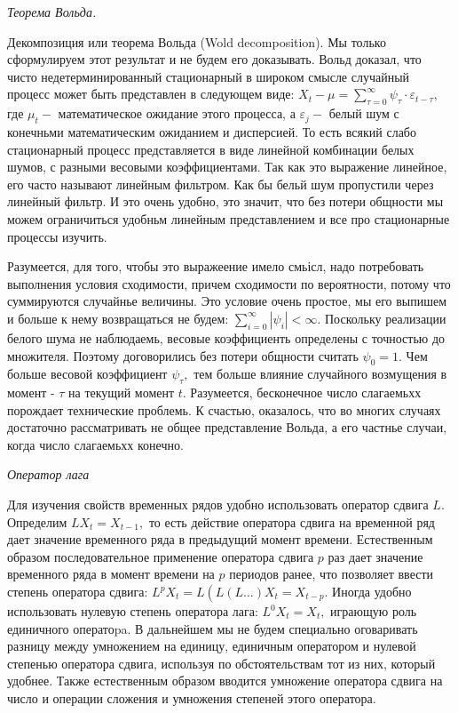 \documentclass[a4paper,8pt]{article} %
\begin{document}
\textit{Теорема Вольда. }

Декомпозиция или теорема Вольда (Wold decomposition). Мы только сформулируем этот результат и не будем его доказывать. Вольд доказал, что чисто недетерминированный стационарный в широком смысле случайный процесс может быть представлен в следующем виде: $X_{t}-\mu=\sum_{\tau=0}^{\infty} \psi_{\tau} \cdot \varepsilon_{t-\tau},$ где $\mu_{t}-$ математическое ожидание этого процесса, а $\varepsilon_{j}-$ белый шум с конечньми математическим ожиданием и дисперсией. То есть всякий слабо стационарный процесс представляется в виде линейной комбинации белых шумов, с разными весовыми коэффициентами. Так как это выражение линейное, его часто называют линейным фильтром. Как бы бельй шум пропустили через линейный фильтр. И это очень удобно, это значит, что без потери общности мы можем ограничиться удобньм линейным представлением и все про стационарные процессы изучить.

Разумеется, для того, чтобы это выражеение имело смьісл, надо потребовать выполнения условия сходимости, причем сходимости по вероятности, потому что суммируются случайнье величины. Это условие очень простое, мы его выпишем и больше к нему возвращаться не будем: $\sum_{i=0}^{\infty}\left|\psi_{i}\right|<\infty .$ Поскольку реализации белого шума не наблюдаемь, весовые коэффициенть определены с точностью до множителя. Поэтому договорились без потери общности считать $\psi_{0}=1 .$ Чем больше
весовой коэффициент $\psi_{\tau},$ тем больше влияние случайного возмущения в момент
- $\tau$ на текущий момент $t .$ Разумеется, бесконечное число слагаемьхх порождает технические проблемь. К счастью, оказалось, что во многих случаях достаточно рассматривать не общее представление Вольда, а его частнье случаи, когда число слагаемьхх конечно.


\textit{Оператор лага}

Для изучения свойств временных рядов удобно использовать оператор сдвига $L .$ Определим $L X_{t}=X_{t-1},$ то есть действие оператора сдвига на временной ряд дает значение временного ряда в предыдущий момент времени. Естественным образом последовательное применение оператора сдвига $p$ раз дает значение временного ряда в момент времени на $p$ периодов ранее, что позволяет ввести степень оператора сдвига: $L^{p} X_{t}=L\left(L(L \ldots) X_{t}=X_{t-p} .\right.$ Иногда удобно использовать
нулевую степень оператора лага: $L^{0} X_{t}=X_{t},$ играющую роль единичного оператоpa. В дальнейшем мы не будем специально оговаривать разницу между умножением на единицу, единичным оператором и нулевой степенью оператора сдвига, используя по обстоятельствам тот из них, который удобнее. Также естественным образом вводится умножение оператора сдвига на число и операции сложения и умножения степеней этого оператора.
\end{document}
